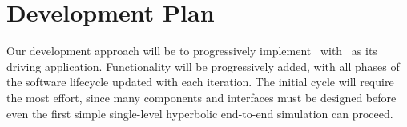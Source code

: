 \documentclass[10pt,twocolumn]{article}
\begin{document}

\section{Development Plan} \label{s:plan}




Our development approach will be to progressively implement \cello\ with
\enzoii\ as its driving application.  Functionality will be
progressively added, with all phases of the software lifecycle updated
with each iteration.  The initial cycle will require the most effort,
since many components and interfaces must be designed before even the
first simple single-level hyperbolic end-to-end simulation can
proceed.
\end{document}
